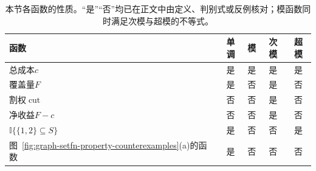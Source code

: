 \begin{table}[!htb]
  \centering
  \caption{本节各函数的性质。“是”“否”均已在正文中由定义、判别式或反例核对；模函数同时满足次模与超模的不等式。}
  \label{tab:graph-setfn-property-summary}
  \small
  \begin{tabular}{@{}lcccc@{}}
    \toprule
    函数 & 单调 & 模 & 次模 & 超模 \\
    \midrule
    总成本$c$ & 是 & 是 & 是 & 是 \\
    覆盖量$F$ & 是 & 否 & 是 & 否 \\
    割权$\operatorname{cut}$ & 否 & 否 & 是 & 否 \\
    净收益$F-c$ & 否 & 否 & 是 & 否 \\
    $\mathbb I\{\{1,2\}\subseteq S\}$ & 是 & 否 & 否 & 是 \\
    图~\ref{fig:graph-setfn-property-counterexamples}(a)的函数 & 是 & 否 & 否 & 否 \\
    \bottomrule
  \end{tabular}
\end{table}
